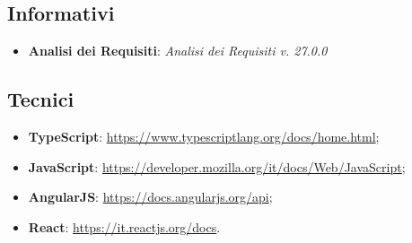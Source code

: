         \subsection{Informativi}
        \begin{itemize}
        	\item \textbf{Analisi dei Requisiti}: \textit{Analisi dei Requisiti v. 27.0.0}
        \end{itemize}
        \subsection{Tecnici}
            \begin{itemize}
                \item \textbf{TypeScript}: \url{https://www.typescriptlang.org/docs/home.html};
                \item \textbf{JavaScript}: \url{https://developer.mozilla.org/it/docs/Web/JavaScript};
                \item \textbf{AngularJS}: \url{https://docs.angularjs.org/api};
                \item \textbf{React}: \url{https://it.reactjs.org/docs}.
            \end{itemize}